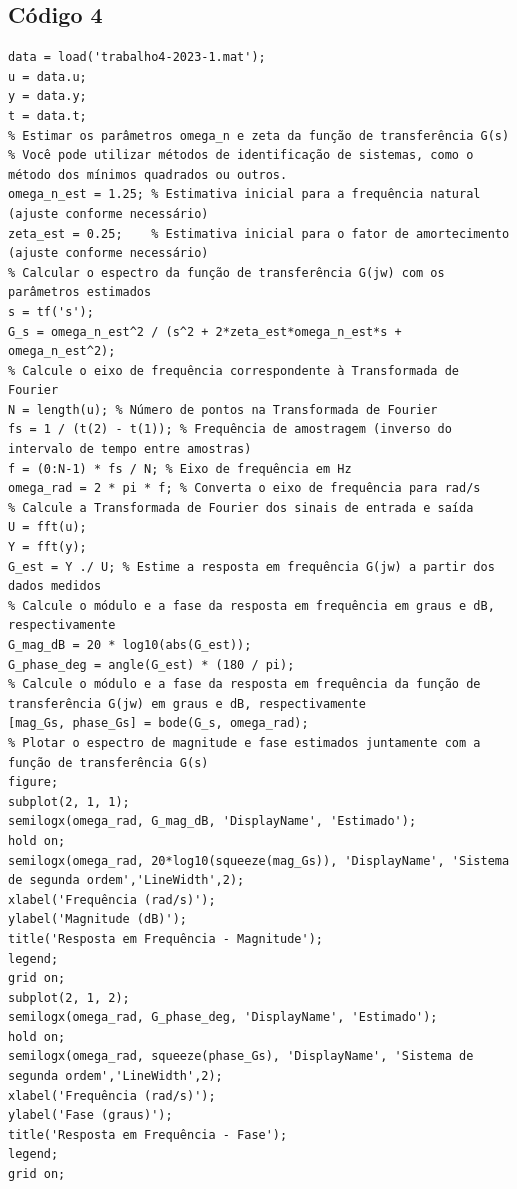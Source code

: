 \documentclass[10pt]{article}
\begin{document}
\begin{appendices}
\newpage

\section{Código 4}

\begin{verbatim}
data = load('trabalho4-2023-1.mat');
u = data.u;
y = data.y;
t = data.t;
% Estimar os parâmetros omega_n e zeta da função de transferência G(s)
% Você pode utilizar métodos de identificação de sistemas, como o método dos mínimos quadrados ou outros.
omega_n_est = 1.25; % Estimativa inicial para a frequência natural (ajuste conforme necessário)
zeta_est = 0.25;    % Estimativa inicial para o fator de amortecimento (ajuste conforme necessário)
% Calcular o espectro da função de transferência G(jw) com os parâmetros estimados
s = tf('s');
G_s = omega_n_est^2 / (s^2 + 2*zeta_est*omega_n_est*s + omega_n_est^2);
% Calcule o eixo de frequência correspondente à Transformada de Fourier
N = length(u); % Número de pontos na Transformada de Fourier
fs = 1 / (t(2) - t(1)); % Frequência de amostragem (inverso do intervalo de tempo entre amostras)
f = (0:N-1) * fs / N; % Eixo de frequência em Hz
omega_rad = 2 * pi * f; % Converta o eixo de frequência para rad/s
% Calcule a Transformada de Fourier dos sinais de entrada e saída
U = fft(u);
Y = fft(y);
G_est = Y ./ U; % Estime a resposta em frequência G(jw) a partir dos dados medidos
% Calcule o módulo e a fase da resposta em frequência em graus e dB, respectivamente
G_mag_dB = 20 * log10(abs(G_est));
G_phase_deg = angle(G_est) * (180 / pi);
% Calcule o módulo e a fase da resposta em frequência da função de transferência G(jw) em graus e dB, respectivamente
[mag_Gs, phase_Gs] = bode(G_s, omega_rad);
% Plotar o espectro de magnitude e fase estimados juntamente com a função de transferência G(s)
figure;
subplot(2, 1, 1);
semilogx(omega_rad, G_mag_dB, 'DisplayName', 'Estimado');
hold on;
semilogx(omega_rad, 20*log10(squeeze(mag_Gs)), 'DisplayName', 'Sistema de segunda ordem','LineWidth',2);
xlabel('Frequência (rad/s)');
ylabel('Magnitude (dB)');
title('Resposta em Frequência - Magnitude');
legend;
grid on;
subplot(2, 1, 2);
semilogx(omega_rad, G_phase_deg, 'DisplayName', 'Estimado');
hold on;
semilogx(omega_rad, squeeze(phase_Gs), 'DisplayName', 'Sistema de segunda ordem','LineWidth',2);
xlabel('Frequência (rad/s)');
ylabel('Fase (graus)');
title('Resposta em Frequência - Fase');
legend;
grid on;
\end{verbatim}

\end{appendices}
\end{document}

